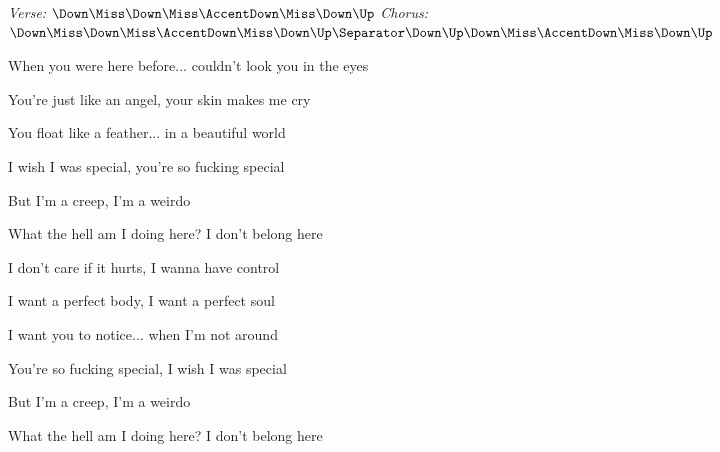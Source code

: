 \begin{song}


\begin{headerbox}
\RaiseBoxWithAccents
{} \quad
\textit{Verse:} $\Down\Miss\Down\Miss\AccentDown\Miss\Down\Up$ \quad
\textit{Chorus:} $\Down\Miss\Down\Miss\AccentDown\Miss\Down\Up \Separator \Down\Up\Down\Miss\AccentDown\Miss\Down\Up$
\end{headerbox}

\begin{hchordbox}
\end{hchordbox}

\Large

\bigskip

\Intro {}    \par

\bigskip

When you were here before... couldn't look you in the eyes \par
You're just like an angel, your skin makes me cry \par
You float like a feather... in a beautiful world \par
I wish I was special, you're so fucking special \par

\bigskip

But I'm a creep, I'm a weirdo \par
What the hell am I doing here? I don't belong here \par

\bigskip

I don't care if it hurts, I wanna have control \par
I want a perfect body, I want a perfect soul \par
I want you to notice... when I'm not around \par
You're so fucking special, I wish I was special \par

\bigskip

But I'm a creep, I'm a weirdo \par
What the hell am I doing here? I don't belong here \par


\end{song}
